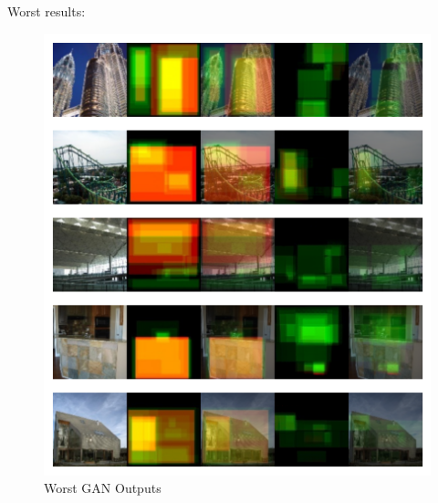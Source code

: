 \documentclass{UoYCSproject}
\begin{document}
Worst results:
\begin{figure}[ht]
    \centering
    \includegraphics[width=\linewidth]{Worst GAN Outputs}
    \caption{Worst GAN Outputs}
    \label{fig:GANWorstOutput}
\end{figure}
\end{document}
